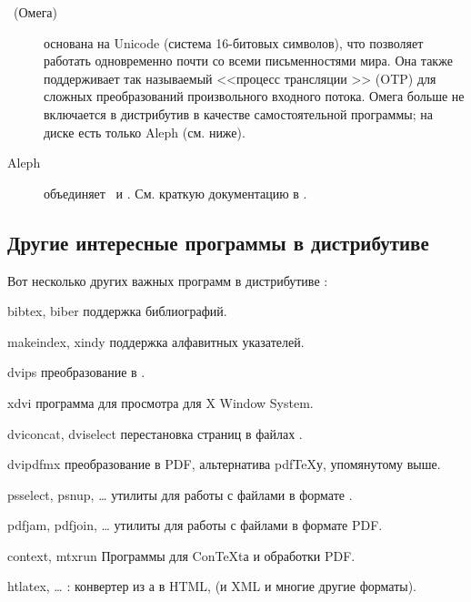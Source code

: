 \documentclass{article}
\begin{document}
\begin{description}
\item [\OMEGA\ (Омега)] основана на Unicode (система 16-битовых
  символов), что позволяет работать одновременно почти со всеми
  письменностями мира. Она также поддерживает так называемый <<процесс
  трансляции \OMEGA{}>> (OTP) для сложных преобразований
  произвольного входного потока. Омега больше не включается в
  дистрибутив \TL{} в качестве самостоятельной программы;  на диске
  есть только Aleph (см. ниже).


\item[Aleph] объединяет \OMEGA\ и \eTeX.  См. краткую документацию в
  . 

\end{description} 


\subsection{Другие интересные программы в дистрибутиве \protect\TL}

Вот несколько других важных программ в дистрибутиве \TL{}:

\begin{cmddescription}

\item [bibtex, biber] поддержка библиографий.

\item [makeindex, xindy] поддержка алфавитных указателей.

\item [dvips] преобразование \dvi{} в \PS{}.

\item [xdvi] программа для просмотра \dvi{} для X Window System.


\item [dviconcat, dviselect] перестановка страниц в файлах \dvi{}.

\item [dvipdfmx] преобразование \dvi{} в PDF, альтернатива
  pdf\TeX{}у, упомянутому выше.  

\item [psselect, psnup, \ldots] утилиты для работы с файлами в формате
  \PS{}.

\item [pdfjam, pdfjoin, \ldots] утилиты для работы с файлами в формате
  PDF. 

\item [context, mtxrun] Программы для Con\TeX{}tа и обработки PDF.

\item [htlatex, \ldots] : конвертер из \AllTeX{}а в
  HTML, (и XML и многие
  другие форматы).

\end{cmddescription}
\end{document}
